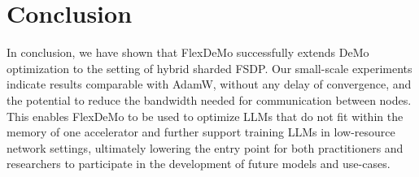 \section{Conclusion}
In conclusion, we have shown that FlexDeMo successfully extends DeMo optimization to the setting of hybrid sharded FSDP. Our small-scale experiments indicate results comparable with AdamW, without any delay of convergence, and the potential to reduce the bandwidth needed for communication between nodes. This enables FlexDeMo to be used to optimize LLMs that do not fit within the memory of one accelerator and further support training LLMs in low-resource network settings, ultimately lowering the entry point for both practitioners and researchers to participate in the development of future models and use-cases.

